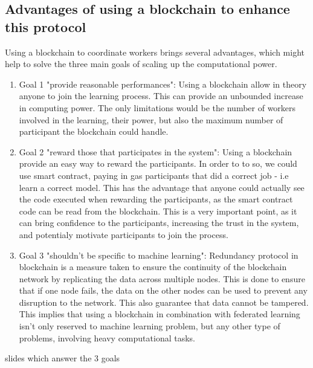 \documentclass{article}
\begin{document}
\subsection{Advantages of using a blockchain to enhance this protocol}
Using a blockchain to coordinate workers brings several advantages, which might help to solve the three main goals of
scaling up the computational power.
\begin{enumerate}
    \item Goal 1 "provide reasonable performances": Using a blockchain allow in theory anyone to join the learning
process. This can provide an unbounded increase in computing power. The only limitations would be the number of workers
involved in the learning, their power, but also the maximum number of participant the blockchain could handle.
    \item Goal 2 "reward those that participates in the system": Using a blockchain provide an easy way to reward the
participants. In order to to so, we could use smart contract, paying in gas participants that did a correct job - i.e
learn a correct model. This has the advantage that anyone could actually see the code executed when rewarding the
participants, as the smart contract code can be read from the blockchain. This is a very important point,
as it can bring confidence to the participants, increasing the trust in the system, and potentialy motivate participants
to join the process.
    \item Goal 3 "shouldn't be specific to machine learning": Redundancy protocol in blockchain is a measure taken to
ensure the continuity of the blockchain network by replicating the data across multiple nodes. This is done to ensure
that if one node fails, the data on the other nodes can be used to prevent any disruption to the network. This also
guarantee that data cannot be tampered. This implies that using a blockchain in combination with federated learning
isn't only reserved to machine learning problem, but any other type of problems, involving heavy computational tasks.
\end{enumerate}

slides which answer the 3 goals
\end{document}
